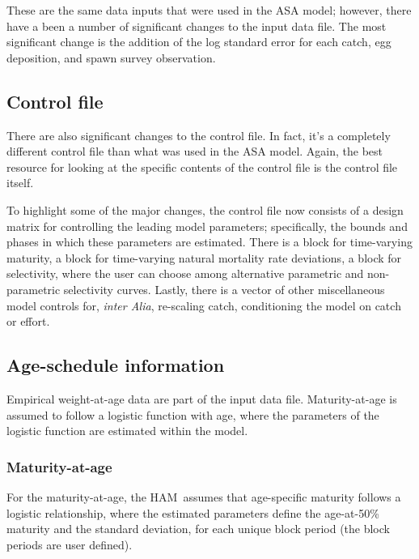 \documentclass[12pt,letterpaper]{article}
\newcommand{\ham}{HAM}
\begin{document}
    These are the same data inputs that were used in the ASA model; however, there have a been a number of significant changes to the input data file.  The most significant change is the addition of the log standard error for each catch, egg deposition, and spawn survey observation.  

  \subsection{Control file} %
  \label{sub:control_file}
    There are also significant changes to the control file.  In fact, it's a completely different control file than what was used in the ASA model.  Again, the best resource for looking at the specific contents of the control file is the control file itself. 


    To highlight some of the major changes, the control file now consists of a design matrix for controlling the leading model parameters; specifically, the bounds and phases in which these parameters are estimated.  There is a block for time-varying maturity, a block for time-varying natural mortality rate deviations, a block for selectivity, where the user can choose among alternative parametric and non-parametric selectivity curves. Lastly, there is a vector of other miscellaneous model controls for, \textit{inter Alia}, re-scaling catch, conditioning the model on catch or effort.  


  \subsection{Age-schedule information} %
  \label{sub:age_schedule_information}
    Empirical weight-at-age data are part of the input data file.  Maturity-at-age is assumed to follow a logistic function with age, where the parameters of the logistic function are estimated within the model. 

    
    \subsubsection{Maturity-at-age} %
    \label{ssub:maturity_at_age}
      For the maturity-at-age, the \ham\ assumes that age-specific maturity follows a logistic relationship, where the estimated parameters define the age-at-50\% maturity and the standard deviation, for each unique block period (the block periods are user defined). 
\end{document}
